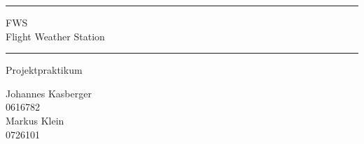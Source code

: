 \documentclass[a4paper,english,12pt,oneside]{memoir}
\newcommand\HRule{\noindent\rule{\linewidth}{1.5pt}}
\begin{document}
\begin{titlingpage}
    \HRule
    \begin{center}
        \LARGE FWS \\ 
        Flight Weather Station
    \end{center}
    \HRule
    \begin{center}
        \Large Projektpraktikum \\
        
     \end{center}
    \begin{center}
        \vspace{30pt}
        \normalsize Johannes Kasberger \\
        0616782 \\
        \vspace{15pt}
        Markus Klein \\
        0726101
     \end{center}
 \end{titlingpage}

\tableofcontents
\newpage
\listoffigures






\end{document}
